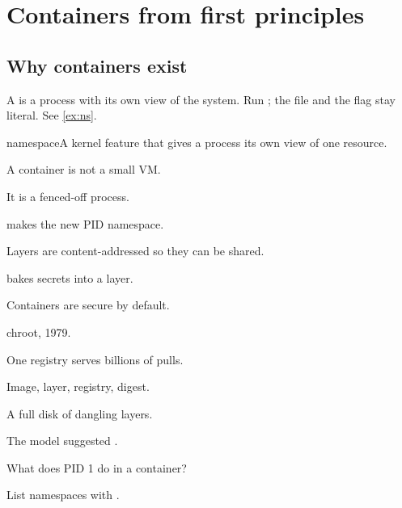 \documentclass[11pt,oneside]{book}
\begin{document}
\chapter{Containers from first principles}\label{ch:one}
\section{Why containers exist}
A  is a process with its own view of the system. Run ; the
file  and the flag  stay literal. See \cref{ex:ns}.
\begin{definition}{namespace}A kernel feature that gives a process its own view of one resource.\end{definition}
\begin{keyidea}A container is not a small VM.\end{keyidea}
\begin{plainwords}It is a fenced-off process.\end{plainwords}
\begin{underthehood} makes the new PID namespace.\end{underthehood}
\begin{designnote}Layers are content-addressed so they can be shared.\end{designnote}
\begin{gotcha} bakes secrets into a layer.\end{gotcha}
\begin{misconception}Containers are secure by default.\end{misconception}
\begin{origin}chroot, 1979.\end{origin}
\begin{scale}One registry serves billions of pulls.\end{scale}
\begin{vocab}Image, layer, registry, digest.\end{vocab}
\begin{outage}A full disk of dangling layers.\end{outage}
\begin{aiwatch}The model suggested .\end{aiwatch}
\begin{interview}What does PID 1 do in a container?\end{interview}
\begin{tryit}List namespaces with .\end{tryit}
\end{document}
